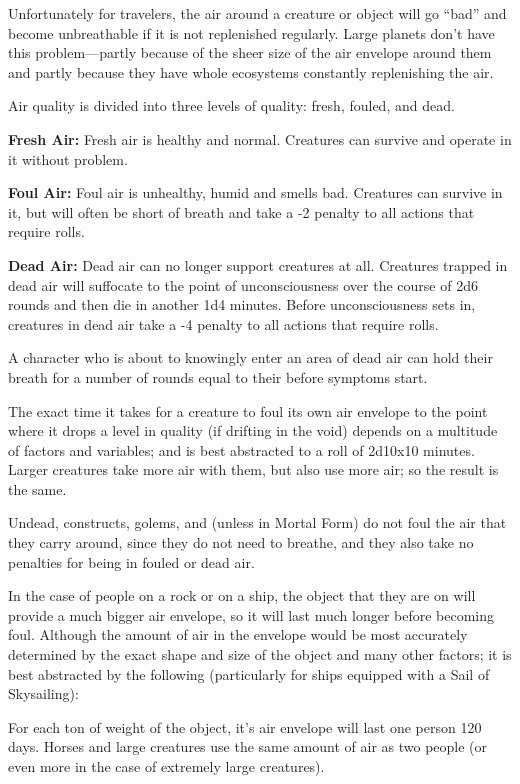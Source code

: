 \begin{multicols*}{2}
Unfortunately for travelers, the air around a creature or object will go “bad” and become unbreathable if it is not replenished regularly. Large planets don’t have this problem—partly because of the sheer size of the air envelope around them and partly because they have whole ecosystems constantly replenishing the air.

Air quality is divided into three levels of quality: fresh, fouled, and dead.

\textbf{Fresh Air:} Fresh air is healthy and normal. Creatures can survive and operate in it without problem.

\textbf{Foul Air:} Foul air is unhealthy, humid and smells bad. Creatures can survive in it, but will often be short of breath and take a -2 penalty to all actions that require rolls.

\textbf{Dead Air:} Dead air can no longer support creatures at all. Creatures trapped in dead air will suffocate to the point of unconsciousness over the course of 2d6 rounds and then die in another 1d4 minutes. Before unconsciousness sets in, creatures in dead air take a -4 penalty to all actions that require rolls.

A character who is about to knowingly enter an area of dead air can hold their breath for a number of rounds equal to their  before symptoms start.

The exact time it takes for a creature to foul its own air envelope to the point where it drops a level in quality (if drifting in the void) depends on a multitude of factors and variables; and is best abstracted to a roll of 2d10x10 minutes. Larger creatures take more air with them, but also use more air; so the result is the same.

Undead, constructs, golems, and  (unless in Mortal Form) do not foul the air that they carry around, since they do not need to breathe, and they also take no penalties for being in fouled or dead air.

In the case of people on a rock or on a ship, the object that they are on will provide a much bigger air envelope, so it will last much longer before becoming foul. Although the amount of air in the envelope would be most accurately determined by the exact shape and size of the object and many other factors; it is best abstracted by the following (particularly for ships equipped with a Sail of Skysailing):

For each ton of weight of the object, it’s air envelope will last one person 120 days. Horses and large creatures use the same amount of air as two people (or even more in the case of extremely large creatures).


\end{multicols*}
